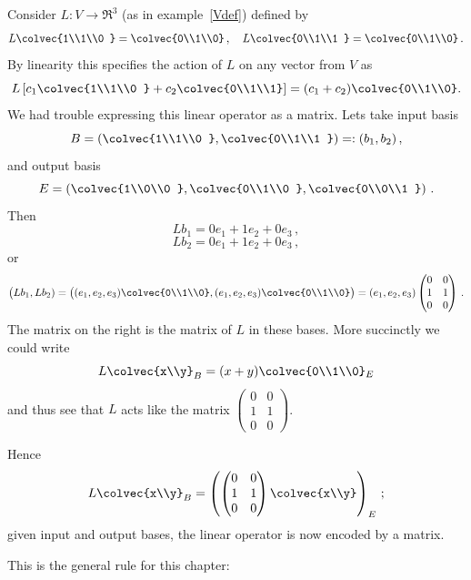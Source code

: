 \begin{example}
Consider 
$L:V\to \Re^3$ (as in example~\ref{Vdef}) defined by 
\[
L\colvec{1\\1\\0 } = \colvec{0\\1\\0}\, ,\quad
L\colvec{0\\1\\1 } = \colvec{0\\1\\0}\, .
\]
By linearity this specifies the action of $L$ on any vector from $V$ as
\[
L\left[ c_1\colvec{1\\1\\0 } + c_2 \colvec{0\\1\\1} \right]= (c_1+c_2)\colvec{0\\1\\0}.
\]
We had trouble expressing this linear operator as a matrix. Lets take input basis
\[
B=\left(\colvec{1\\1\\0 } ,\colvec{0\\1\\1 }\right)=:(b_1,b_2)\, ,
\]
and output basis 
\[
E=\left(\colvec{1\\0\\0 } ,\colvec{0\\1\\0 } ,\colvec{0\\0\\1 }\right)\, .
\]
Then
\[
L b_1 = 0 e_1 + 1e_2+ 0  e_3 \, ,
\]
\[
L b_2 = 0 e_1 + 1e_2+ 0  e_3 \, ,
\]
or 
\[
\big(Lb_1, L b_2) = \big( (e_1,e_2,e_3)\colvec{0\\1\\0}, (e_1,e_2,e_3)\colvec{0\\1\\0}\big)=(e_1,e_2,e_3)\begin{pmatrix}0&0\\1&1\\0&0
\end{pmatrix}\, .
\]
The matrix on the right is the matrix of $L$ in these bases.
More succinctly we could write
\[
L\colvec{x\\y}_B=(x+y) \colvec{0\\1\\0}_E
\]
and thus see that $L$ acts like the matrix 
$
\begin{pmatrix}
0&0\\
1&1\\
0&0
\end{pmatrix}
$.

Hence
\[L\colvec{x\\y}_B
=\left(  \begin{pmatrix}
0&0\\
1&1\\
0&0
\end{pmatrix}
\colvec{x\\y} \right)_E\, ;
\]
given input and output bases, the linear operator is now encoded by a matrix.
\end{example}
This is the general rule for this chapter:




